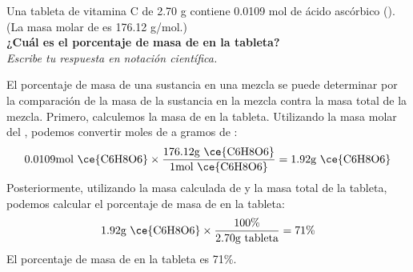 Una tableta de vitamina C de 2.70 g contiene 0.0109 mol de ácido ascórbico (). (La masa molar de  es 176.12 g/mol.)\\
\textbf{¿Cuál es el porcentaje de masa de  en la tableta?}\\
\emph{Escribe tu respuesta en notación científica.}

\begin{solutionbox}{6cm}
    El porcentaje de masa de una sustancia en una mezcla se puede determinar por la comparación de la masa de la sustancia en la mezcla contra la masa total de la mezcla.
    Primero, calculemos la masa de  en la tableta. Utilizando la masa molar del , podemos convertir moles de  a gramos de :
    \[0.0109\text{mol \ce{C6H8O6}} \times \frac{176.12\text{g \ce{C6H8O6}}}{1\text{mol \ce{C6H8O6}}} = 1.92 \text{g \ce{C6H8O6}}\]
    Posteriormente, utilizando la masa calculada de  y la masa total de la tableta, podemos calcular el porcentaje de masa de  en la tableta:
    \[1.92\text{g \ce{C6H8O6}} \times \frac{100\%}{2.70\text{g tableta}} = 71\%\]
    El porcentaje de masa de  en la tableta es 71\%.
\end{solutionbox}